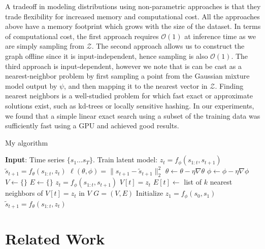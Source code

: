 \documentclass{article}
\begin{document}
A tradeoff in modeling distributions using non-parametric approaches is that they trade flexibility for increased memory and computational cost.
All the approaches above have a memory footprint which grows with the size of the dataset.
In terms of computational cost, the first approach requires $\mathcal{O}(1)$ at inference time as we are simply sampling from $\mathcal{Z}$.
The second approach allows us to construct the graph offline since it is input-independent, hence sampling is also $\mathcal{O}(1)$.
The third approach is input-dependent, however we note that is can be cast as a nearest-neighbor problem by first sampling a point from the Gaussian mixture model output by $\psi$, and then mapping it to the nearest vector in $\mathcal{Z}$. Finding nearest neighbors is a well-studied problem for which fast exact or approximate solutions exist, such as kd-trees or locally sensitive hashing. In our experiments, we found that a simple linear exact search using a subset of the training data was sufficiently fast using a GPU and achieved good results.

\begin{algorithm}
  \caption{My algorithm}\label{algo}
  \begin{algorithmic}[1]
    \State \textbf{Input}: Time series $\{s_1...s_T\}$.
    \State Train latent model:
    \State $z_t = f_{\phi}(s_{1:t}, s_{t+1})$
    \State $\tilde{s}_{t+1} = f_{\theta}(s_{1:t}, z_t)$
    \State $\ell(\theta, \phi) = \|s_{t+1} - \tilde{s}_{t+1} \|_2^2$
    \State $\theta \leftarrow \theta - \eta \nabla \theta$
    \State $\phi \leftarrow \phi - \eta \nabla \phi$
    \EndWhile
    \State $V \leftarrow \{ \}$
    \State $E \leftarrow \{ \}$
    \State $z_t = f_{\phi}(s_{1:t}, s_{t+1})$
    \State $V[t] = z_t$
    \EndFor
    \State $E[t] \leftarrow $ list of $k$ nearest neighbors of $V[t] = z_t$ in $V$
    \EndFor
    \Return $G = (V, E)$
    \EndProcedure
    \State Initialize $z_1 = f_{\phi}(s_0, s_1)$
    \State $\tilde{s}_{t+1} = f_{\theta}(s_{1:t}, z_t)$
    \EndFor
    \EndProcedure
  \end{algorithmic}
\end{algorithm}


\section{Related Work}
\end{document}
